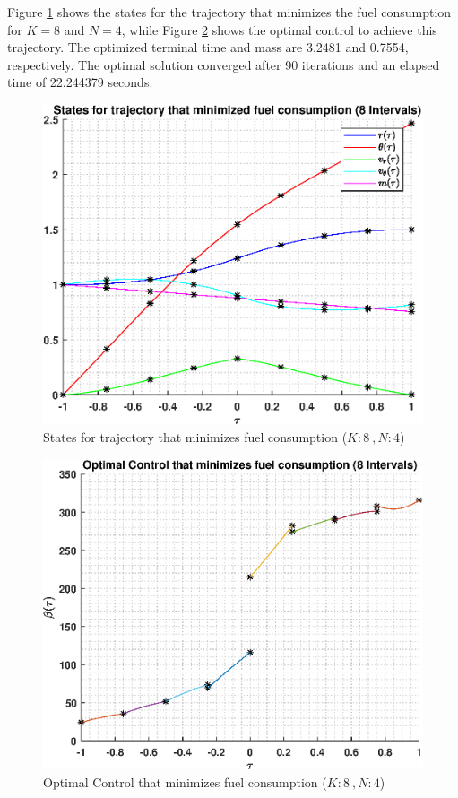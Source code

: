 \documentclass[]{article}
\begin{document}
Figure \ref{fig:directStatesK8Poly4} shows the states for the trajectory that minimizes the fuel consumption for \(K = 8\) and  \(N = 4\), while Figure \ref{fig:directControlK8Poly4} shows the optimal control to achieve this trajectory. The optimized terminal time and mass are 3.2481 and 0.7554, respectively. The optimal solution converged after 90 iterations and an elapsed time of 22.244379 seconds.
\begin{figure}
	\centering
	\includegraphics[scale=0.75]{directStatesK8Poly4.eps}
	\caption{States for trajectory that minimizes fuel consumption (\(K:8\ , N:4\))}
	\label{fig:directStatesK8Poly4}
\end{figure}
\begin{figure}
	\centering
	\includegraphics[scale=0.75]{directControlK8Poly4.eps}
	\caption{Optimal Control that minimizes fuel consumption (\(K:8\ , N:4\))}
	\label{fig:directControlK8Poly4}
\end{figure}
\FloatBarrier
\end{document}
